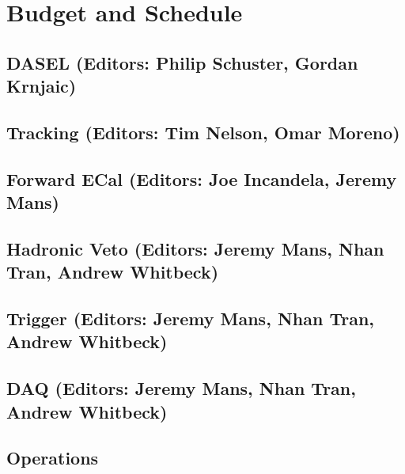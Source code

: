 \section{Budget and Schedule}

\subsection{DASEL (Editors: Philip Schuster, Gordan Krnjaic)}

\subsection{Tracking (Editors: Tim Nelson, Omar Moreno)}

\subsection{Forward ECal (Editors: Joe Incandela, Jeremy Mans)}

\subsection{Hadronic Veto (Editors: Jeremy Mans, Nhan Tran, Andrew Whitbeck)}

\subsection{Trigger (Editors: Jeremy Mans, Nhan Tran, Andrew Whitbeck)}

\subsection{DAQ (Editors: Jeremy Mans, Nhan Tran, Andrew Whitbeck)}

\subsection{Operations}

